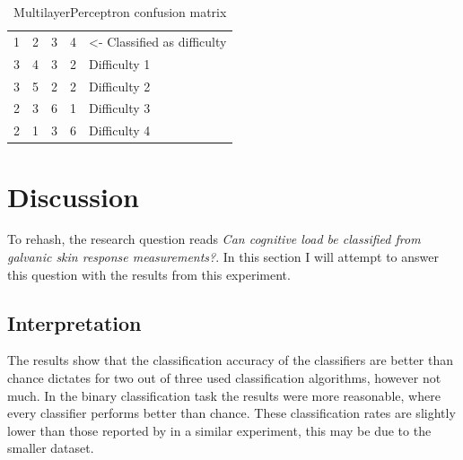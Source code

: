 \documentclass[11pt,leqno,a4paper]{report} %
\begin{document}

\begin{table}[h]
\caption {MultilayerPerceptron confusion matrix} 
\center
\begin{tabular}{ccccl}
\multicolumn{1}{l}{1} & \multicolumn{1}{l}{2} & \multicolumn{1}{l}{3} & \multicolumn{1}{l}{4} & \small{\textless- Classified as difficulty} \\ \cline{1-4}
3                          & 4                          & 3                          & \multicolumn{1}{c|}{2}     & Difficulty 1                    \\
3                          & 5                          & 2                          & \multicolumn{1}{c|}{2}     & Difficulty 2                    \\
2                          & 3                          & 6                          & \multicolumn{1}{c|}{1}     & Difficulty 3                    \\
2                          & 1                          & 3                          & \multicolumn{1}{c|}{6}     & Difficulty 4                   
\end{tabular}
\end{table}







\chapter{Discussion}

To rehash, the research question reads \emph{Can cognitive load be classified from galvanic skin response measurements?}. In this section I will attempt to answer this question with the results from this experiment.

\section{Interpretation}

The results show that the classification accuracy of the classifiers are better than chance dictates for two out of three used classification algorithms, however not much. In the binary classification task the results were more reasonable, where every classifier performs better than chance.
These classification rates are slightly lower than those reported by \citep{Nourbakhsh2013} in a similar experiment, this may be due to the smaller dataset.
\end{document}
